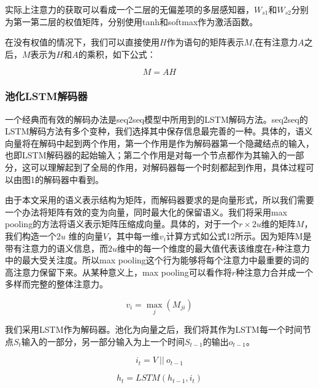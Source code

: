 \documentclass[UTF8,11pt,a4paper,nofonts]{ctexart}
\begin{document}
实际上注意力的获取可以看成一个二层的无偏差项的多层感知器，$W_{s1}$和$W_{s2}$分别为第一第二层的权值矩阵，分别使用tanh和softmax作为激活函数。


在没有权值的情况下，我们可以直接使用$H$作为语句的矩阵表示$M$,在有注意力$A$之后，$M$表示为$H$和$A$的乘积，如下公式：


\begin{equation}
 M = A H
\end{equation}



\subsubsection{池化LSTM解码器}

一个经典而有效的解码办法是seq2seq模型\cite{Sutskever2014SequenceTS}中所用到的LSTM解码方法。seq2seq的LSTM解码方法有多个变种，我们选择其中保存信息最完善的一种。具体的，语义向量将在解码中起到两个作用，第一个作用是作为解码器第一个隐藏结点的输入，也即LSTM解码器的起始输入；第二个作用是对每一个节点都作为其输入的一部分，这可以理解起到了全局的作用，对解码器每一个时刻都起到作用，具体过程可以由图1的解码器中看到。


由于本文采用的语义表示结构为矩阵，而解码器要求的是向量形式，所以我们需要一个办法将矩阵有效的变为向量，同时最大化的保留语义。我们将采用max pooling的方法将语义表示矩阵压缩成向量。具体的，对于一个$r \times 2u$维的矩阵$M$，我们构造一个$2u$ 维的向量$V$，其中每一维$v_i$计算方式如公式12所示。因为矩阵M是带有注意力的语义信息，而$2u$维中的每一个维度的最大值代表该维度在$r$种注意力中的最大受关注度。所以max pooling这个行为能够将每个注意力中最重要的词的高注意力保留下来。从某种意义上，max pooling可以看作将$r$种注意力合并成一个多样而完整的整体注意力。

\begin{equation}
v_i = \max_j(M_{ji})
\end{equation}

我们采用LSTM作为解码器。池化为向量之后，我们将其作为LSTM每一个时间节点$S_t$输入的一部分，另一部分输入为上一个时间$S_{t-1}$的输出$o_{t-1}$。


\begin{equation}
i_{t} = V ~||~ o_{t-1}
\end{equation}

\begin{equation}
h_{t} = LSTM(h_{t-1}, i_{t})
\end{equation}
\end{document}
